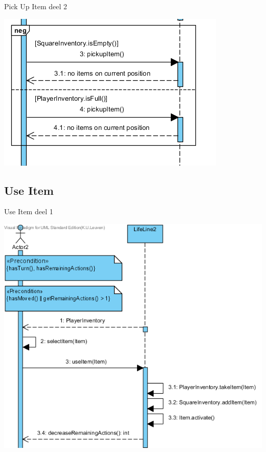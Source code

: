 \documentclass[t]{beamer}
\begin{document}
\begin{frame}{Pick Up Item deel 2}
\begin{center}
\includegraphics[scale=0.9]{images/SSDPickUpItem2}
\end{center}
\end{frame}


\subsection{Use Item}
\begin{frame}{Use Item deel 1}
\begin{center}
\includegraphics[scale=0.5]{images/SSDUseItem1}
\end{center}
\end{frame}
\end{document}
